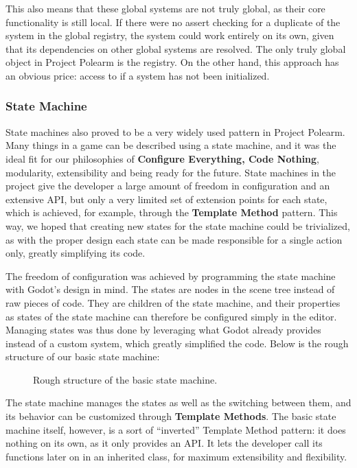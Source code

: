 \documentclass[../Main.tex]{subfiles}
\begin{document}
This also means that these global systems are not truly global, as their core functionality is still local. If there were no assert checking for a duplicate of the system in the global registry, the system could work entirely on its own, given that its dependencies on other global systems are resolved. The only truly global object in Project Polearm is the  registry. On the other hand, this approach has an obvious price: access to  if a system has not been initialized.

\subsubsection{State Machine}\label{sec:state-machine}

State machines\autocite[]{nystrom_state} also proved to be a very widely used pattern in Project Polearm. Many things in a game can be described using a state machine, and it was the ideal fit for our philosophies of \textbf{Configure Everything, Code Nothing}, modularity, extensibility and being ready for the future. State machines in the project give the developer a large amount of freedom in configuration and an extensive API, but only a very limited set of extension points for each state, which is achieved, for example, through the \textbf{Template Method} pattern. This way, we hoped that creating new states for the state machine could be trivialized, as with the proper design each state can be made responsible for a single action only, greatly simplifying its code.

The freedom of configuration was achieved by programming the state machine with Godot's design in mind. The states are nodes in the scene tree instead of raw pieces of code. They are children of the state machine, and their properties as states of the state machine can therefore be configured simply in the editor. Managing states was thus done by leveraging what Godot already provides instead of a custom system, which greatly simplified the code. Below is the rough structure of our basic state machine:

\begin{figure}[H]
    \centering
    
    \caption[Rough structure of the basic state machine. Own figure.]{Rough structure of the basic state machine.}
    \label{fig:basic-state-machine}
\end{figure}

The state machine manages the states as well as the switching between them, and its behavior can be customized through \textbf{Template Methods}. The basic state machine itself, however, is a sort of \enquote{inverted} Template Method pattern: it does nothing on its own, as it only provides an API. It lets the developer call its functions later on in an inherited class, for maximum extensibility and flexibility.
\end{document}
